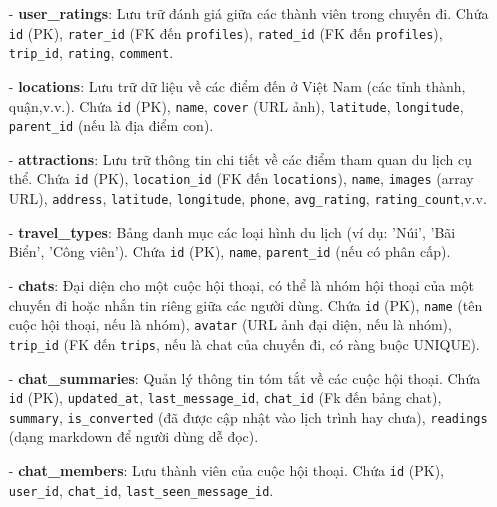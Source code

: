 \begin{itemize}
    \item[-] \textbf{user\_ratings}: Lưu trữ đánh giá giữa các thành viên trong chuyến đi. Chứa \texttt{id} (PK), \texttt{rater\_id} (FK đến \texttt{profiles}), \texttt{rated\_id} (FK đến \texttt{profiles}), \texttt{trip\_id}, \texttt{rating}, \texttt{comment}.

    \item[-] \textbf{locations}: Lưu trữ dữ liệu về các điểm đến ở Việt Nam (các tỉnh thành, quận,v.v.). Chứa \texttt{id} (PK), \texttt{name}, \texttt{cover} (URL ảnh), \texttt{latitude}, \texttt{longitude}, \texttt{parent\_id} (nếu là địa điểm con).

    \item[-] \textbf{attractions}: Lưu trữ thông tin chi tiết về các điểm tham quan du lịch cụ thể. Chứa \texttt{id} (PK), \texttt{location\_id} (FK đến \texttt{locations}), \texttt{name}, \texttt{images} (array URL), \texttt{address}, \texttt{latitude}, \texttt{longitude}, \texttt{phone}, \texttt{avg\_rating}, \texttt{rating\_count},v.v.


    \item[-] \textbf{travel\_types}: Bảng danh mục các loại hình du lịch (ví dụ: 'Núi', 'Bãi Biển', 'Công viên'). Chứa \texttt{id} (PK), \texttt{name}, \texttt{parent\_id} (nếu có phân cấp).

    \item[-] \textbf{chats}: Đại diện cho một cuộc hội thoại, có thể là nhóm hội thoại của một chuyến đi hoặc nhắn tin riêng giữa các người dùng. Chứa \texttt{id} (PK), \texttt{name} (tên cuộc hội thoại, nếu là nhóm), \texttt{avatar} (URL ảnh đại diện, nếu là nhóm), \texttt{trip\_id} (FK đến \texttt{trips}, nếu là chat của chuyến đi, có ràng buộc UNIQUE).
    
    \item[-] \textbf{chat\_summaries}: Quản lý thông tin tóm tắt về các cuộc hội thoại. Chứa \texttt{id} (PK), \texttt{updated\_at}, \texttt{last\_message\_id}, \texttt{chat\_id} (Fk đến bảng chat), \texttt{summary}, \texttt{is\_converted} (đã được cập nhật vào lịch trình hay chưa), \texttt{readings} (dạng markdown để người dùng dễ đọc).

    \item[-] \textbf{chat\_members}: Lưu thành viên của cuộc hội thoại. Chứa \texttt{id} (PK), \texttt{user\_id}, \texttt{chat\_id}, \texttt{last\_seen\_message\_id}.


\end{itemize}
